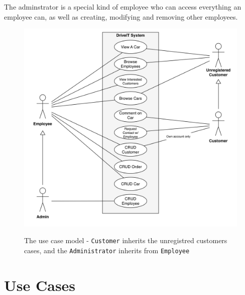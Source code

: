 The adminstrator is a special kind of employee who can access everything an employee can, as well as creating, modifying and removing other employees.\\

\begin{figure}[h!]
    \centering
        \includegraphics[scale=0.4]{Figures/UseCase-Model}\\
    \caption{The use case model - \texttt{Customer} inherits the unregistred customers cases, and the \texttt{Administrator} inherits from \texttt{Employee}}
  \label{fig:UseCaseModel}
\end{figure}

\section{Use Cases}












